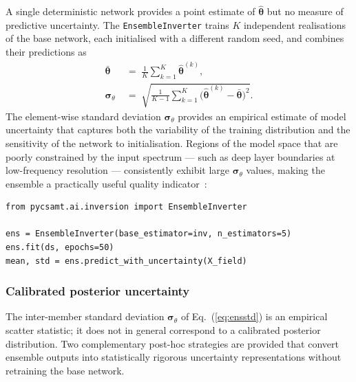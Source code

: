 \documentclass[review,12pt]{elsarticle}
\begin{document}
A single deterministic network provides a point estimate of
$\hat{\boldsymbol\theta}$ but no measure of predictive uncertainty.
The \texttt{EnsembleInverter} trains $K$ independent realisations of the
base network, each initialised with a different random seed, and combines
their predictions as
\begin{align}
  \bar{\boldsymbol\theta} &\;=\;
    \frac{1}{K}\sum_{k=1}^{K}\hat{\boldsymbol\theta}^{(k)},
    \label{eq:ensmean}\\
  \bm{\sigma}_\theta &\;=\;
    \sqrt{\frac{1}{K-1}\sum_{k=1}^{K}
      \bigl(\hat{\boldsymbol\theta}^{(k)}-\bar{\boldsymbol\theta}\bigr)^2}.
    \label{eq:ensstd}
\end{align}
The element-wise standard deviation $\bm{\sigma}_\theta$ provides an
empirical estimate of model uncertainty that captures both the variability
of the training distribution and the sensitivity of the network to
initialisation.
Regions of the model space that are poorly constrained by the input spectrum
— such as deep layer boundaries at low-frequency resolution — consistently
exhibit large $\bm{\sigma}_\theta$ values, making the ensemble a
practically useful quality indicator~\citep{Moghadas2020}:

\begin{lstlisting}[style=pycode, caption={Ensemble prediction with uncertainty quantification.}]
from pycsamt.ai.inversion import EnsembleInverter

ens = EnsembleInverter(base_estimator=inv, n_estimators=5)
ens.fit(ds, epochs=50)
mean, std = ens.predict_with_uncertainty(X_field)
\end{lstlisting}

\subsubsection{Calibrated posterior uncertainty}
\label{sec:calibrated_uq}

The inter-member standard deviation $\bm{\sigma}_\theta$ of
Eq.~(\ref{eq:ensstd}) is an empirical scatter statistic; it does not
in general correspond to a calibrated posterior distribution.
Two complementary post-hoc strategies are provided that convert ensemble
outputs into statistically rigorous uncertainty representations without
retraining the base network.
\end{document}
